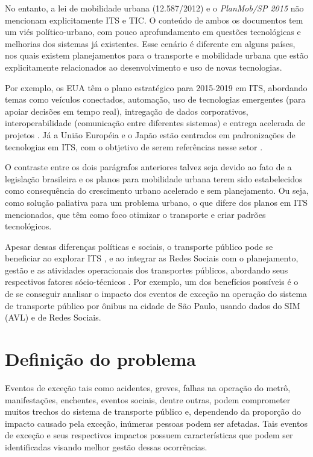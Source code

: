 \documentclass[
	12pt,				%
	oneside,			%
	a4paper,			%
	english,			%
	brazil				%
	]{abntex2ppgsi}
\begin{document}
No entanto, a lei de mobilidade urbana (12.587/2012) e o \textit{PlanMob/SP 2015} não mencionam explicitamente ITS e TIC. O conteúdo de ambos os documentos tem um viés político-urbano, com pouco aprofundamento em questões tecnológicas e melhorias dos sistemas já existentes. Esse cenário é diferente em alguns países, nos quais existem planejamentos para o transporte e mobilidade urbana que estão explicitamente relacionados ao desenvolvimento e uso de novas tecnologias.

Por exemplo, os EUA têm o plano estratégico para 2015-2019 em ITS, abordando temas como veículos conectados, automação, uso de tecnologias emergentes (para apoiar decisões em tempo real), intregação de dados corporativos, interoperabilidade (comunicação entre diferentes sistemas) e entrega acelerada de projetos \cite{itsdot}. Já a União Européia e o Japão estão centrados em padronizações de tecnologias em ITS, com o obtjetivo de serem referências nesse setor \cite{consulo2016evaluation}.

O contraste entre os dois parágrafos anteriores talvez seja devido ao fato de a legislação brasileira e os planos para mobilidade urbana terem sido estabelecidos como consequência do crescimento urbano acelerado e sem planejamento. Ou seja, como solução paliativa para um problema urbano, o que difere dos planos em ITS mencionados, que têm como foco otimizar o transporte e criar padrões tecnológicos. 

Apesar dessas diferenças políticas e sociais, o transporte público pode se beneficiar ao explorar ITS \cite{Nelson2013}, e ao integrar as Redes Sociais com o planejamento, gestão e as atividades operacionais dos transportes públicos, abordando seus respectivos fatores sócio-técnicos \cite{kuflik2017automating}. Por exemplo, um dos benefícios possíveis é o de se conseguir analisar o impacto dos eventos de exceção na operação do sistema de transporte público por ônibus na cidade de São Paulo, usando dados do SIM (AVL) e de Redes Sociais.

\section{Definição do problema}
\label{problemDef}

Eventos de exceção tais como acidentes, greves, falhas na operação do metrô, manifestações, enchentes, eventos sociais, dentre outras, podem  comprometer muitos trechos do sistema de transporte público e, dependendo da proporção do impacto causado pela exceção, inúmeras pessoas podem ser afetadas. Tais eventos de exceção e seus respectivos impactos possuem características que podem ser identificadas visando melhor gestão dessas  ocorrências. 
\end{document}
